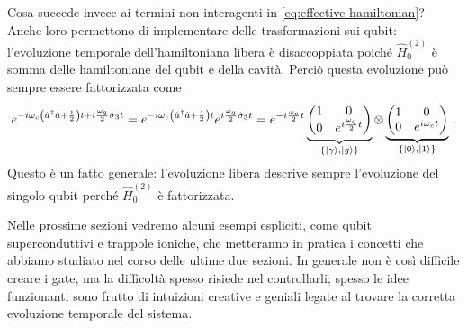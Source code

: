 \noindent Cosa succede invece ai termini non interagenti in \eqref{eq:effective-hamiltonian}? Anche loro permettono di implementare delle trasformazioni sui qubit: l'evoluzione temporale dell'hamiltoniana libera è disaccoppiata poiché $\hat{H}^{(2)}_0$ è somma delle hamiltoniane del qubit e della cavità. Perciò questa evoluzione può sempre essere fattorizzata come
\begin{equation*}
    e^{-i\omega_c\left(\hat a^\dagger \hat a + \frac 12\right)t + i\frac{\omega_q}{2}\hat \sigma_3t} = e^{-i\omega_c\left(\hat a^\dagger \hat a + \frac 12\right)t}e^{i\frac{\omega_q}{2}\hat \sigma_3t}=
    e^{-i\frac{\omega_c}{2}t}
    \underbrace{\begin{pmatrix}
        1 & 0\\
        0 & e^{i\frac{\omega_q}{2}t}
    \end{pmatrix}
    }_{\{\ket \gamma, \ket g\}}
    \otimes
    \underbrace{
    \begin{pmatrix}
        1 & 0\\
        0 & e^{i\omega_c t}
    \end{pmatrix}
    }_{\{\ket 0, \ket 1\}} \, .
\end{equation*}
Questo è un fatto generale: l'evoluzione libera descrive sempre l'evoluzione del singolo qubit perché $\hat{H}^{(2)}_0$ è fattorizzata. 

\noindent Nelle prossime sezioni vedremo alcuni esempi espliciti, come qubit superconduttivi e trappole ioniche, che metteranno in pratica i concetti che abbiamo studiato nel corso delle ultime due sezioni. In generale non è così difficile creare i gate, ma la difficoltà spesso risiede nel controllarli; spesso le idee funzionanti sono frutto di intuizioni creative e geniali legate al trovare la corretta evoluzione temporale del sistema. 
